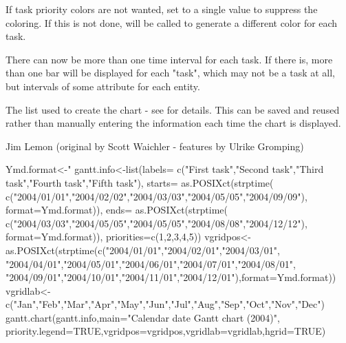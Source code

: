 \begin{Details}\relax
If task priority colors are not wanted, set  to a single
value to suppress the coloring. If this is not done,  will
be called to generate a different color for each task.

There can now be more than one time interval for each task. If there is,
more than one bar will be displayed for each "task", which may not be a
task at all, but intervals of some attribute for each entity.
\end{Details}
\begin{Value}
The list used to create the chart - see  for
details. This can be saved and reused rather than manually entering the 
information each time the chart is displayed.
\end{Value}
\begin{Author}\relax
Jim Lemon (original by Scott Waichler - features by Ulrike Gromping)
\end{Author}
\begin{SeeAlso}\relax
{}
\end{SeeAlso}
\begin{Examples}
\begin{ExampleCode}
 Ymd.format<-"%
 gantt.info<-list(labels=
  c("First task","Second task","Third task","Fourth task","Fifth task"),
  starts=
  as.POSIXct(strptime(
  c("2004/01/01","2004/02/02","2004/03/03","2004/05/05","2004/09/09"),
  format=Ymd.format)),
  ends=
  as.POSIXct(strptime(
  c("2004/03/03","2004/05/05","2004/05/05","2004/08/08","2004/12/12"),
  format=Ymd.format)),
  priorities=c(1,2,3,4,5))
 vgridpos<-as.POSIXct(strptime(c("2004/01/01","2004/02/01","2004/03/01",
  "2004/04/01","2004/05/01","2004/06/01","2004/07/01","2004/08/01",
  "2004/09/01","2004/10/01","2004/11/01","2004/12/01"),format=Ymd.format))
 vgridlab<-
  c("Jan","Feb","Mar","Apr","May","Jun","Jul","Aug","Sep","Oct","Nov","Dec")
 gantt.chart(gantt.info,main="Calendar date Gantt chart (2004)",
  priority.legend=TRUE,vgridpos=vgridpos,vgridlab=vgridlab,hgrid=TRUE)
\end{ExampleCode}
\end{Examples}

